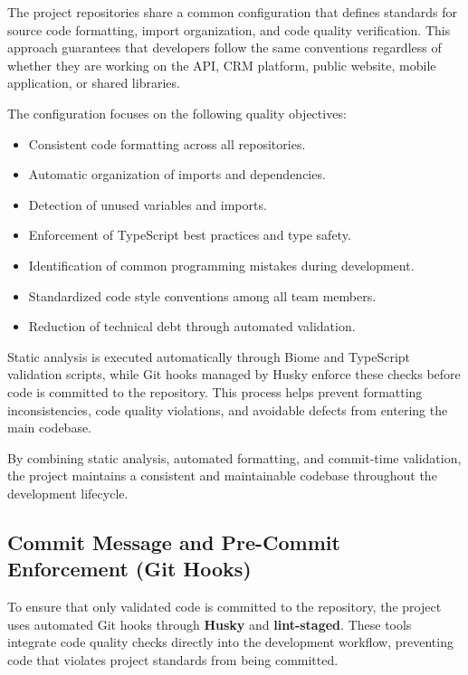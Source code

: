 \documentclass[letterpaper%
, oneside%
, 12pt%
, memoireprojet%
, english%
,creativecommons,hyperref, withAlgo2e %
]{thETS}
\begin{document}
The project repositories share a common configuration that defines standards for source code formatting, import organization, and code quality verification. This approach guarantees that developers follow the same conventions regardless of whether they are working on the API, CRM platform, public website, mobile application, or shared libraries.

The configuration focuses on the following quality objectives:

\begin{itemize}
\item Consistent code formatting across all repositories.
\item Automatic organization of imports and dependencies.
\item Detection of unused variables and imports.
\item Enforcement of TypeScript best practices and type safety.
\item Identification of common programming mistakes during development.
\item Standardized code style conventions among all team members.
\item Reduction of technical debt through automated validation.
\end{itemize}

Static analysis is executed automatically through Biome and TypeScript validation scripts, while Git hooks managed by Husky enforce these checks before code is committed to the repository. This process helps prevent formatting inconsistencies, code quality violations, and avoidable defects from entering the main codebase.

By combining static analysis, automated formatting, and commit-time validation, the project maintains a consistent and maintainable codebase throughout the development lifecycle.


\subsection{Commit Message and Pre-Commit Enforcement (Git Hooks)}

To ensure that only validated code is committed to the repository, the project uses automated Git hooks through \textbf{Husky} and \textbf{lint-staged}. These tools integrate code quality checks directly into the development workflow, preventing code that violates project standards from being committed.
\end{document}
